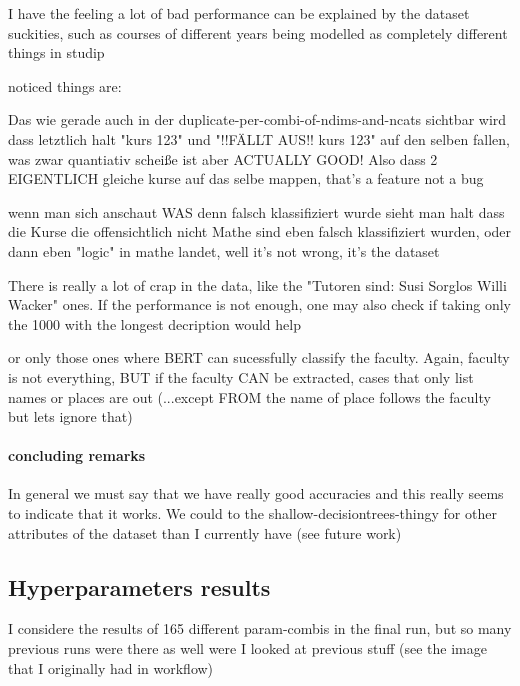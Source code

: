 I have the feeling a lot of bad performance can be explained by the dataset suckities, such as courses of different years being modelled as completely different things in studip

noticed things are:

Das wie gerade auch in der duplicate-per-combi-of-ndims-and-ncats sichtbar wird dass letztlich halt "kurs 123" und "!!FÄLLT AUS!! kurs 123" auf den selben fallen, was zwar quantiativ scheiße ist aber ACTUALLY GOOD! Also dass 2 EIGENTLICH gleiche kurse auf das selbe mappen, that's a feature not a bug

wenn man sich anschaut WAS denn falsch klassifiziert wurde sieht man halt dass die Kurse die offensichtlich nicht Mathe sind eben falsch klassifiziert wurden, oder dann eben "logic" in mathe landet, well it's not wrong, it's the dataset 

There is really a lot of crap in the data, like the  "Tutoren sind: Susi Sorglos Willi Wacker" ones. If the performance is not enough, one may also check if taking only the 1000 with the longest decription would help

or only those ones where BERT can sucessfully classify the faculty. Again, faculty is not everything, BUT if the faculty CAN be extracted, cases that only list names or places are out (...except FROM the name of place follows the faculty but lets ignore that)



\paragraph{concluding remarks}

In general we must say that we have really good accuracies and this really seems to indicate that it works.  We could to the shallow-decisiontrees-thingy for other attributes of the dataset than I currently have (see future work)

\subsection{Hyperparameters results}

I considere the results of 165 different param-combis in the final run, but so many previous runs were there as well were I looked at previous stuff (see the image that I originally had in workflow)


